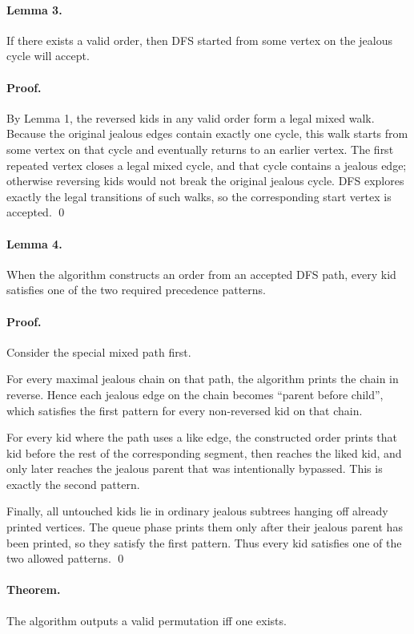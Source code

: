 \documentclass[11pt]{article}
\begin{document}
\paragraph{Lemma 3.}
If there exists a valid order, then DFS started from some vertex on the jealous cycle will accept.

\paragraph{Proof.}
By Lemma 1, the reversed kids in any valid order form a legal mixed walk. Because the original jealous edges contain exactly one cycle, this walk starts from some vertex on that cycle and eventually returns to an earlier vertex. The first repeated vertex closes a legal mixed cycle, and that cycle contains a jealous edge; otherwise reversing kids would not break the original jealous cycle. DFS explores exactly the legal transitions of such walks, so the corresponding start vertex is accepted. \qed

\paragraph{Lemma 4.}
When the algorithm constructs an order from an accepted DFS path, every kid satisfies one of the two required precedence patterns.

\paragraph{Proof.}
Consider the special mixed path first.

For every maximal jealous chain on that path, the algorithm prints the chain in reverse. Hence each jealous edge on the chain becomes ``parent before child'', which satisfies the first pattern for every non-reversed kid on that chain.

For every kid where the path uses a like edge, the constructed order prints that kid before the rest of the corresponding segment, then reaches the liked kid, and only later reaches the jealous parent that was intentionally bypassed. This is exactly the second pattern.

Finally, all untouched kids lie in ordinary jealous subtrees hanging off already printed vertices. The queue phase prints them only after their jealous parent has been printed, so they satisfy the first pattern.
Thus every kid satisfies one of the two allowed patterns. \qed

\paragraph{Theorem.}
The algorithm outputs a valid permutation iff one exists.
\end{document}
